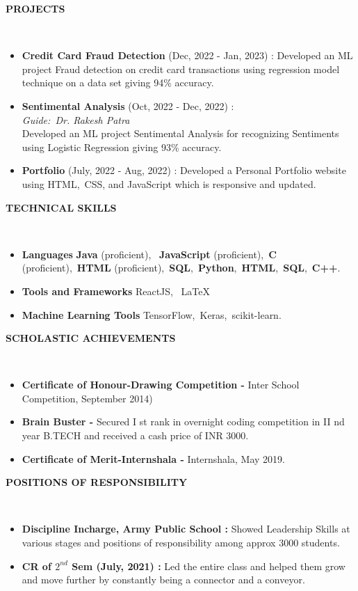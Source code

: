 \documentclass[a4paper,10pt]{article}
\newcommand{\lsep}{-0.5cm}
\newcommand{\resheading}[1]{{\small \colorbox{mygrey}{\begin{minipage}{0.975\textwidth}{\textbf{#1 \vphantom{p\^{E}}}}\end{minipage}}}}
\begin{document}
\resheading{\textbf{PROJECTS} }\\[\lsep]
\begin{itemize}
\setlength\itemsep{0.5em}
\item \textbf{Credit Card Fraud Detection} (Dec, 2022 - Jan, 2023) : Developed an ML project Fraud detection on credit card transactions using regression model technique on a data set giving 94\% accuracy.

\item \textbf{Sentimental Analysis} (Oct, 2022 - Dec, 2022) : \\
\textit{Guide:\ Dr. Rakesh Patra}\\
Developed an ML project Sentimental Analysis for recognizing
Sentiments using Logistic Regression giving 93\% accuracy.
\item \textbf{Portfolio} (July, 2022 - Aug, 2022) : Developed a Personal Portfolio website using HTML,\ CSS, and JavaScript
which is responsive and updated.
\end{itemize}

\resheading{\textbf{TECHNICAL SKILLS} }\\[\lsep]
\begin{itemize}
\setlength\itemsep{0em}
\item \noindent \textbf{Languages} \textbf{Java} (proficient), \ \textbf{JavaScript} (proficient),\ \textbf{C} (proficient),\ \textbf{HTML} (proficient),\ \textbf{SQL},\ \textbf{Python},\ \textbf{HTML},\ \textbf{SQL},\ \textbf{C++}.\ \\
 \item \noindent\textbf{Tools and Frameworks} ReactJS, \  \LaTeX\\
\item \noindent \textbf{Machine Learning Tools} TensorFlow,\ Keras,\ scikit-learn.
\end{itemize}

\resheading{\textbf{SCHOLASTIC ACHIEVEMENTS} }\\[\lsep]
\begin{itemize}
\setlength\itemsep{0em}
\item \noindent \textbf{Certificate of Honour-Drawing Competition - }Inter School Competition, September 2014)
\item \noindent\textbf{Brain Buster - }Secured I st rank in overnight coding competition in II nd year B.TECH and received a cash price of INR
3000.
\item \noindent\textbf{Certificate of Merit-Internshala - }Internshala, May 2019.

\end{itemize}

\resheading{\textbf{POSITIONS OF RESPONSIBILITY} }\\[\lsep]
\begin{itemize}
\setlength\itemsep{0em}
\item \noindent \textbf{Discipline Incharge, Army Public School :} Showed Leadership Skills at various stages and positions of responsibility among approx 3000 students.
\item \noindent \textbf{CR of ${2^{nd}}$ Sem (July, 2021) :} Led the entire class and helped them grow and move further by constantly being a connector and a conveyor.

\end{itemize}
\end{document}

